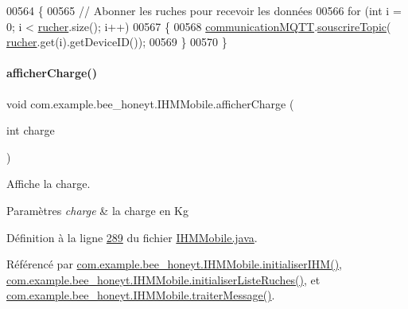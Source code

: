 \begin{DoxyCode}
00564     \{
00565         \textcolor{comment}{// Abonner les ruches pour recevoir les données}
00566         \textcolor{keywordflow}{for} (\textcolor{keywordtype}{int} i = 0; i < \hyperlink{classcom_1_1example_1_1bee__honeyt_1_1_i_h_m_mobile_a80b422d45e9b5c91f7bcad1dca4ad292}{rucher}.size(); i++)
00567         \{
00568             \hyperlink{classcom_1_1example_1_1bee__honeyt_1_1_i_h_m_mobile_a832529dab7bfae5405c5496e971e8c84}{communicationMQTT}.\hyperlink{classcom_1_1example_1_1bee__honeyt_1_1_communication_aa1093a3d4f3479595a36ef2425f3ef70}{souscrireTopic}(
      \hyperlink{classcom_1_1example_1_1bee__honeyt_1_1_i_h_m_mobile_a80b422d45e9b5c91f7bcad1dca4ad292}{rucher}.get(i).getDeviceID());
00569         \}
00570     \}
\end{DoxyCode}
\mbox{\label{classcom_1_1example_1_1bee__honeyt_1_1_i_h_m_mobile_a64c55ee927d9cb31265989d0296edc53}} 
\paragraph{\texorpdfstring{afficher\+Charge()}{afficherCharge()}}
{\footnotesize\ttfamily void com.\+example.\+bee\+\_\+honeyt.\+I\+H\+M\+Mobile.\+afficher\+Charge (\begin{DoxyParamCaption}\item[{int}]{charge }\end{DoxyParamCaption})}



Affiche la charge. 


\begin{DoxyParams}{Paramètres}
{\em charge} & la charge en Kg \\
\hline
\end{DoxyParams}


Définition à la ligne \hyperlink{_i_h_m_mobile_8java_source_l00289}{289} du fichier \hyperlink{_i_h_m_mobile_8java_source}{I\+H\+M\+Mobile.\+java}.



Référencé par \hyperlink{_i_h_m_mobile_8java_source_l00152}{com.\+example.\+bee\+\_\+honeyt.\+I\+H\+M\+Mobile.\+initialiser\+I\+H\+M()}, \hyperlink{_i_h_m_mobile_8java_source_l00170}{com.\+example.\+bee\+\_\+honeyt.\+I\+H\+M\+Mobile.\+initialiser\+Liste\+Ruches()}, et \hyperlink{_i_h_m_mobile_8java_source_l00374}{com.\+example.\+bee\+\_\+honeyt.\+I\+H\+M\+Mobile.\+traiter\+Message()}.


